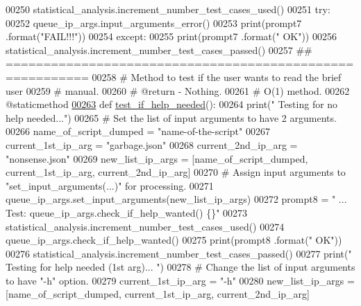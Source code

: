 \begin{DoxyCode}
00250         statistical\_analysis.increment\_number\_test\_cases\_used()
00251         \textcolor{keywordflow}{try}:
00252             queue\_ip\_args.input\_arguments\_error()
00253             print(prompt7 .format(\textcolor{stringliteral}{"FAIL!!!"}))
00254         \textcolor{keywordflow}{except}:
00255             print(prompt7 .format(\textcolor{stringliteral}{" OK"}))
00256             statistical\_analysis.increment\_number\_test\_cases\_passed()
00257     \textcolor{comment}{## =========================================================}
00258     \textcolor{comment}{#   Method to test if the user wants to read the brief user}
00259     \textcolor{comment}{#       manual.}
00260     \textcolor{comment}{#   @return - Nothing.}
00261     \textcolor{comment}{#   O(1) method.}
00262     @staticmethod
\hypertarget{queue__ip__arguments__tester_8py_source_l00263}{}\hyperlink{classutilities_1_1queue__ip__arguments__tester_1_1queue__ip__args__tester_a4af9d2177916d79d95fc9de5531162af}{00263}     \textcolor{keyword}{def }\hyperlink{classutilities_1_1queue__ip__arguments__tester_1_1queue__ip__args__tester_a4af9d2177916d79d95fc9de5531162af}{test\_if\_help\_needed}():
00264         print(\textcolor{stringliteral}{" Testing for no help needed..."})
00265         \textcolor{comment}{#   Set the list of input arguments to have 2 arguments.}
00266         name\_of\_script\_dumped = \textcolor{stringliteral}{"name-of-the-script"}
00267         current\_1st\_ip\_arg = \textcolor{stringliteral}{"garbage.json"}
00268         current\_2nd\_ip\_arg = \textcolor{stringliteral}{"nonsense.json"}
00269         new\_list\_ip\_args = [name\_of\_script\_dumped, current\_1st\_ip\_arg, current\_2nd\_ip\_arg]
00270         \textcolor{comment}{#   Assign input arguments to "set\_input\_arguments(...)" for processing.}
00271         queue\_ip\_args.set\_input\_arguments(new\_list\_ip\_args)
00272         prompt8 = \textcolor{stringliteral}{" ... Test: queue\_ip\_args.check\_if\_help\_wanted()  \{\}"}
00273         statistical\_analysis.increment\_number\_test\_cases\_used()
00274         queue\_ip\_args.check\_if\_help\_wanted()
00275         print(prompt8 .format(\textcolor{stringliteral}{" OK"}))
00276         statistical\_analysis.increment\_number\_test\_cases\_passed()
00277         print(\textcolor{stringliteral}{" Testing for help needed (1st arg)... "})
00278         \textcolor{comment}{#   Change the list of input arguments to have "-h" option.}
00279         current\_1st\_ip\_arg = \textcolor{stringliteral}{"-h"}
00280         new\_list\_ip\_args = [name\_of\_script\_dumped, current\_1st\_ip\_arg, current\_2nd\_ip\_arg]

\end{DoxyCode}
